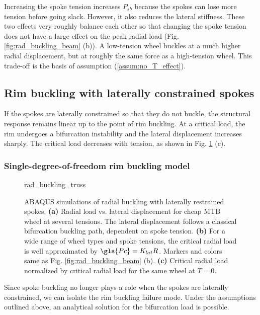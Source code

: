 \documentclass[\rootdir/thesis.tex]{subfiles}
\begin{document}
Increasing the spoke tension increases $P_{sb}$ because the spokes can lose more tension before going slack. However, it also reduces the lateral stiffness. These two effects very roughly balance each other so that changing the spoke tension does not have a large effect on the peak radial load (Fig. \ref{fig:rad_buckling_beam} (b)). A low-tension wheel buckles at a much higher radial displacement, but at roughly the same force as a high-tension wheel. This trade-off is the basis of assumption (\ref{assum:no_T_effect}).

\subsection{Rim buckling with laterally constrained spokes}

If the spokes are laterally constrained so that they do not buckle, the structural response remains linear up to the point of rim buckling. At a critical load, the rim undergoes a bifurcation instability and the lateral displacement increases sharply. The critical load decreases with tension, as shown in Fig. \ref{fig:rad_buckling_truss} (c).

\subsubsection*{Single-degree-of-freedom rim buckling model}

\begin{figure}[t]
\centering
{rad_buckling_truss} 
\caption{ABAQUS simulations of radial buckling with laterally restrained spokes. \textbf{(a)} Radial load vs. lateral displacement for cheap MTB wheel at several tensions. The lateral displacement follows a classical bifurcation buckling path, dependent on spoke tension. \textbf{(b)} For a wide range of wheel types and spoke tensions, the critical radial load is well approximated by $\gls{Pc} = K_{lat}R$. Markers and colors same as Fig. \ref{fig:rad_buckling_beam} (b). \textbf{(c)} Critical radial load normalized by critical radial load for the same wheel at $T=0$.}
\label{fig:rad_buckling_truss}
\end{figure}

Since spoke buckling no longer plays a role when the spokes are laterally constrained, we can isolate the rim buckling failure mode. Under the assumptions outlined above, an analytical solution for the bifurcation load is possible.
\end{document}
